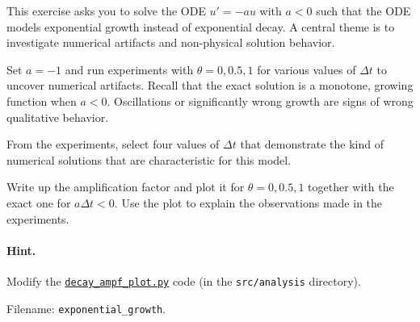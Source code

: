 \documentclass[graybox,sectrefs,envcountresetchap,open=right,final]{svmonodo}
\makeatletter
\newenvironment{doconceexercise}{}{}
\newcounter{doconceexercisecounter}%
\newcommand\listofexercises{
\chapter*{List of Exercises, Problems, and Projects
          \@mkboth{List of Exercises, Problems, and Projects}{List of Exercises, Problems, and Projects}}
\markboth{List of Exercises, Problems, and Projects}{List of Exercises, Problems, and Projects}
\@starttoc{loe}
}
\makeatother
\begin{document}
\begin{doconceexercise}

                
\label{decay:analysis:exer:growth}

This exercise asks you to solve the ODE $u'=-au$ with $a < 0$ such that
the ODE models exponential growth instead of exponential decay.  A
central theme is to investigate numerical artifacts and non-physical
solution behavior.

Set $a=-1$ and run experiments with $\theta=0, 0.5, 1$ for
various values of $\Delta t$ to uncover numerical artifacts.
Recall that the exact solution is a
monotone, growing function when $a < 0$. Oscillations or significantly
wrong growth are signs of wrong qualitative behavior.

From the experiments, select four values of $\Delta t$ that
demonstrate the kind of numerical solutions that are characteristic
for this model.



Write up the amplification factor and plot it for $\theta=0,0.5,1$
together with the exact one for $a\Delta t < 0$. Use the plot to
explain the observations made in the experiments.


\paragraph{Hint.}
Modify the \href{{http://tinyurl.com/ofkw6kc/analysis/decay_ampf_plot.py}}{\nolinkurl{decay_ampf_plot.py}} code
(in the \texttt{src/analysis} directory).




\noindent Filename: \Verb!exponential_growth!.

\end{doconceexercise}
\end{document}
